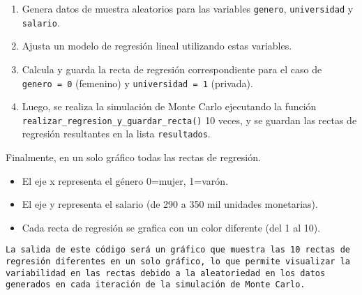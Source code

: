 \documentclass[
]{article}
\begin{document}
\begin{enumerate}
\def\labelenumi{\arabic{enumi}.}
\item
  Genera datos de muestra aleatorios para las variables \texttt{genero},
  \texttt{universidad} y \texttt{salario}.
\item
  Ajusta un modelo de regresión lineal utilizando estas variables.
\item
  Calcula y guarda la recta de regresión correspondiente para el caso de
  \texttt{genero\ =\ 0} (femenino) y \texttt{universidad\ =\ 1}
  (privada).
\item
  Luego, se realiza la simulación de Monte Carlo ejecutando la función
  \texttt{realizar\_regresion\_y\_guardar\_recta()} 10 veces, y se
  guardan las rectas de regresión resultantes en la lista
  \texttt{resultados}.
\end{enumerate}

Finalmente, en un solo gráfico todas las rectas de regresión.

\begin{itemize}
\item
  El eje x representa el género 0=mujer, 1=varón.
\item
  El eje y representa el salario (de 290 a 350 mil unidades monetarias).
\item
  Cada recta de regresión se grafica con un color diferente (del 1 al
  10).
\end{itemize}

\begin{verbatim}
La salida de este código será un gráfico que muestra las 10 rectas de regresión diferentes en un solo gráfico, lo que permite visualizar la variabilidad en las rectas debido a la aleatoriedad en los datos generados en cada iteración de la simulación de Monte Carlo.
\end{verbatim}
\end{document}
